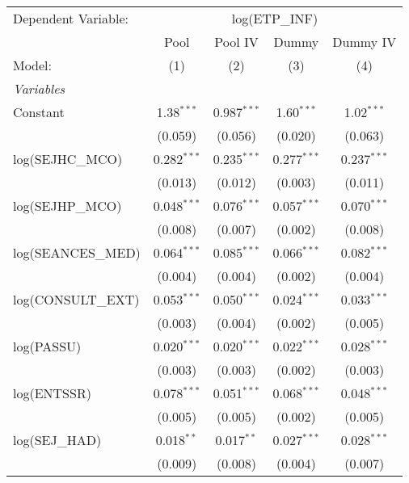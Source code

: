 
\begingroup
\centering
\begin{tabular}{lcccc}
   \tabularnewline \midrule \midrule
   Dependent Variable: & \multicolumn{4}{c}{log(ETP\_INF)}\\
                      & Pool          & Pool IV       & Dummy          & Dummy IV \\   
   Model:             & (1)           & (2)           & (3)            & (4)\\  
   \midrule
   \emph{Variables}\\
   Constant           & 1.38$^{***}$  & 0.987$^{***}$ & 1.60$^{***}$   & 1.02$^{***}$\\   
                      & (0.059)       & (0.056)       & (0.020)        & (0.063)\\   
   log(SEJHC\_MCO)    & 0.282$^{***}$ & 0.235$^{***}$ & 0.277$^{***}$  & 0.237$^{***}$\\   
                      & (0.013)       & (0.012)       & (0.003)        & (0.011)\\   
   log(SEJHP\_MCO)    & 0.048$^{***}$ & 0.076$^{***}$ & 0.057$^{***}$  & 0.070$^{***}$\\   
                      & (0.008)       & (0.007)       & (0.002)        & (0.008)\\   
   log(SEANCES\_MED)  & 0.064$^{***}$ & 0.085$^{***}$ & 0.066$^{***}$  & 0.082$^{***}$\\   
                      & (0.004)       & (0.004)       & (0.002)        & (0.004)\\   
   log(CONSULT\_EXT)  & 0.053$^{***}$ & 0.050$^{***}$ & 0.024$^{***}$  & 0.033$^{***}$\\   
                      & (0.003)       & (0.004)       & (0.002)        & (0.005)\\   
   log(PASSU)         & 0.020$^{***}$ & 0.020$^{***}$ & 0.022$^{***}$  & 0.028$^{***}$\\   
                      & (0.003)       & (0.003)       & (0.002)        & (0.003)\\   
   log(ENTSSR)        & 0.078$^{***}$ & 0.051$^{***}$ & 0.068$^{***}$  & 0.048$^{***}$\\   
                      & (0.005)       & (0.005)       & (0.002)        & (0.005)\\   
   log(SEJ\_HAD)      & 0.018$^{**}$  & 0.017$^{**}$  & 0.027$^{***}$  & 0.028$^{***}$\\   
                      & (0.009)       & (0.008)       & (0.004)        & (0.007)\\   

\end{tabular}
